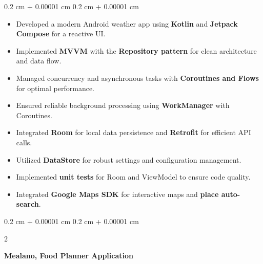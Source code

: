 \documentclass[10pt, letterpaper]{article}
\newenvironment{highlights}{
    \begin{itemize}[
        topsep=0.10 cm,
        parsep=0.10 cm,
        partopsep=0pt,
        itemsep=0pt,
        leftmargin=0.4 cm + 10pt
    ]
}{
    \end{itemize}
} %
\newenvironment{onecolentry}{
    \begin{adjustwidth}{
        0.2 cm + 0.00001 cm
    }{
        0.2 cm + 0.00001 cm
    }
}{
    \end{adjustwidth}
} %
\newenvironment{twocolentry}[2][]{
    \onecolentry
    \def\secondColumn{#2}
    \setcolumnwidth{\fill, 4.5 cm}
    \begin{paracol}{2}
}{
    \switchcolumn \raggedleft \secondColumn
    \end{paracol}
    \endonecolentry
} %
\let\hrefWithoutArrow\href
\renewcommand{\href}[2]{\hrefWithoutArrow{#1}{\ifthenelse{\equal{#2}{}}{ }{#2 }\raisebox{.15ex}{\footnotesize \faExternalLink*}}}
\begin{document}
        \vspace{0.10 cm}
        \begin{onecolentry}
            \begin{highlights}
                \item Developed a modern Android weather app using \textbf{Kotlin} and \textbf{Jetpack Compose} for a reactive UI.
                \item Implemented \textbf{MVVM} with the \textbf{Repository pattern} for clean architecture and data flow.
                \item Managed concurrency and asynchronous tasks with \textbf{Coroutines and Flows} for optimal performance.
                \item Ensured reliable background processing using \textbf{WorkManager} with Coroutines.
                \item Integrated \textbf{Room} for local data persistence and \textbf{Retrofit} for efficient API calls.
                \item Utilized \textbf{DataStore} for robust settings and configuration management.
                \item Implemented \textbf{unit tests} for Room and ViewModel to ensure code quality.
                \item Integrated \textbf{Google Maps SDK} for interactive maps and \textbf{place auto-search}.
            \end{highlights}
        \end{onecolentry}


        \vspace{0.2 cm}

        \begin{twocolentry}{
            \href{https://github.com/Boodyahmedhamdy/Mealano}{Github}
        }
            \textbf{Mealano, Food Planner Application}\end{twocolentry}
\end{document}
